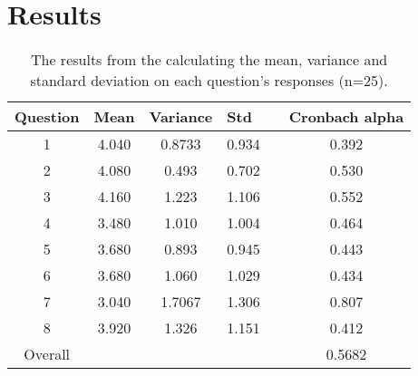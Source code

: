 \section{Results}
\begin{table}[H]
\centering
\caption{The results from the calculating the mean, variance and standard deviation on each question's responses (n=25).}
\label{table:questionsCalc}
\begin{tabular}{@{}cccclc@{}}
\toprule
\multicolumn{1}{l}{Question} & \multicolumn{1}{l}{Mean} & \multicolumn{1}{l}{Variance} & \multicolumn{1}{l}{Std} &  & \multicolumn{1}{l}{Cronbach alpha} \\ \midrule
1                            & 4.040                    & 0.8733                       & 0.934                   &  & 0.392                              \\
2                            & 4.080                    & 0.493                        & 0.702                   &  & 0.530                              \\
3                            & 4.160                    & 1.223                        & 1.106                   &  & 0.552                              \\
4                            & 3.480                    & 1.010                        & 1.004                   &  & 0.464                              \\
5                            & 3.680                    & 0.893                        & 0.945                   &  & 0.443                              \\
6                            & 3.680                    & 1.060                        & 1.029                   &  & 0.434                              \\
7                            & 3.040                    & 1.7067                       & 1.306                   &  & 0.807                              \\
8                            & 3.920                    & 1.326                        & 1.151                   &  & 0.412                              \\ \midrule
Overall                        & \multicolumn{1}{l}{}     & \multicolumn{1}{l}{}         & \multicolumn{1}{l}{}    &  & 0.5682                             \\ \bottomrule
\end{tabular}
\end{table}





